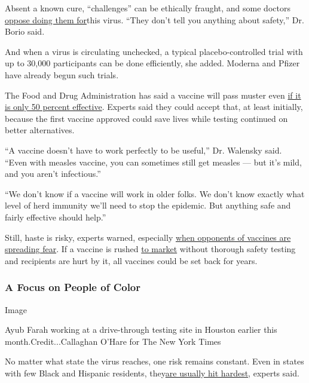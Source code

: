 Absent a known cure, ``challenges'' can be ethically fraught, and some
doctors
\href{https://www.statnews.com/2020/06/23/challenge-trials-live-coronavirus-speedy-covid-19-vaccine/}{oppose
doing them for}this virus. ``They don't tell you anything about
safety,'' Dr. Borio said.

And when a virus is circulating unchecked, a typical placebo-controlled
trial with up to 30,000 participants can be done efficiently, she added.
Moderna and Pfizer have already begun such trials.

The Food and Drug Administration has said a vaccine will pass muster
even
\href{https://www.washingtonpost.com/health/2020/06/30/coronavirus-vaccine-approval-fda/}{if
it is only 50 percent effective}. Experts said they could accept that,
at least initially, because the first vaccine approved could save lives
while testing continued on better alternatives.

``A vaccine doesn't have to work perfectly to be useful,'' Dr. Walensky
said. ``Even with measles vaccine, you can sometimes still get measles
--- but it's mild, and you aren't infectious.''

``We don't know if a vaccine will work in older folks. We don't know
exactly what level of herd immunity we'll need to stop the epidemic. But
anything safe and fairly effective should help.''

Still, haste is risky, experts warned, especially
\href{https://www.nytimes.com/2020/07/18/health/coronavirus-anti-vaccine.html}{when
opponents of vaccines are spreading fear}. If a vaccine is rushed
\href{https://www.nytimes.com/2020/06/08/opinion/trump-coronavirus-vaccine.html}{to
market} without thorough safety testing and recipients are hurt by it,
all vaccines could be set back for years.

\hypertarget{a-focus-on-people-of-color}{%
\subsubsection{A Focus on People of
Color}\label{a-focus-on-people-of-color}}

Image

Ayub Farah working at a drive-through testing site in Houston earlier
this month.Credit...Callaghan O'Hare for The New York Times

No matter what state the virus reaches, one risk remains constant. Even
in states with few Black and Hispanic residents,
they\href{https://www.cdc.gov/coronavirus/2019-ncov/need-extra-precautions/racial-ethnic-minorities.html}{are
usually hit hardest}, experts said.

